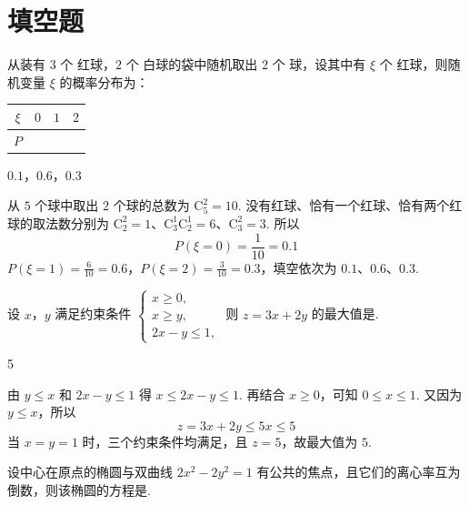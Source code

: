 \section{填空题}
\begin{problem}
从装有 \(3\text{ 个}\) 红球，\(2\text{ 个}\) 白球的袋中随机取出 \(2\text{ 个}\) 球，设其中有 \(\xi\text{ 个}\) 红球，则随机变量 \(\xi\) 的概率分布为：
\begin{center}
\begin{tabular}{|c|c|c|c|}
\hline
\(\xi\) & \(0\) & \(1\) & \(2\) \\
\hline
\(P\) &\fillinblank{} &\fillinblank{} &\fillinblank{} \\
\hline
\end{tabular}
\end{center}
\end{problem}

\begin{answer}
\(0.1\)，\(0.6\)，\(0.3\)
\end{answer}

\begin{solution}
从 \(5\) 个球中取出 \(2\) 个球的总数为 \(\mathrm C_5^2=10\). 没有红球、恰有一个红球、恰有两个红球的取法数分别为
\(\mathrm C_2^2=1\)、\(\mathrm C_3^1\mathrm C_2^1=6\)、\(\mathrm C_3^2=3\). 所以
\[
P(\xi=0)=\frac1{10}=0.1
\]
\(P(\xi=1)=\frac6{10}=0.6\)，\(P(\xi=2)=\frac3{10}=0.3\)，填空依次为 \(0.1\)、\(0.6\)、\(0.3\).
\end{solution}

\begin{problem}
设 \(x\)，\(y\) 满足约束条件 \(\begin{cases}
x \geqslant 0,\\
x \geqslant y,\\
2x - y \leqslant 1,
\end{cases}\) 则 \(z = 3x + 2y\) 的最大值是\fillinblank{}.
\end{problem}

\begin{answer}
5
\end{answer}

\begin{solution}
由 \(y\leqslant x\) 和 \(2x-y\leqslant1\) 得
\(x\leqslant2x-y\leqslant1\). 再结合 \(x\geqslant0\)，可知 \(0\leqslant x\leqslant1\). 又因为 \(y\leqslant x\)，所以
\[
z=3x+2y\leqslant5x\leqslant5
\]
当 \(x=y=1\) 时，三个约束条件均满足，且 \(z=5\)，故最大值为 \(5\).
\end{solution}

\begin{problem}
设中心在原点的椭圆与双曲线 \(2x^{2} - 2y^{2} = 1\) 有公共的焦点，且它们的离心率互为倒数，则该椭圆的方程是\fillinblank{}.
\end{problem}

